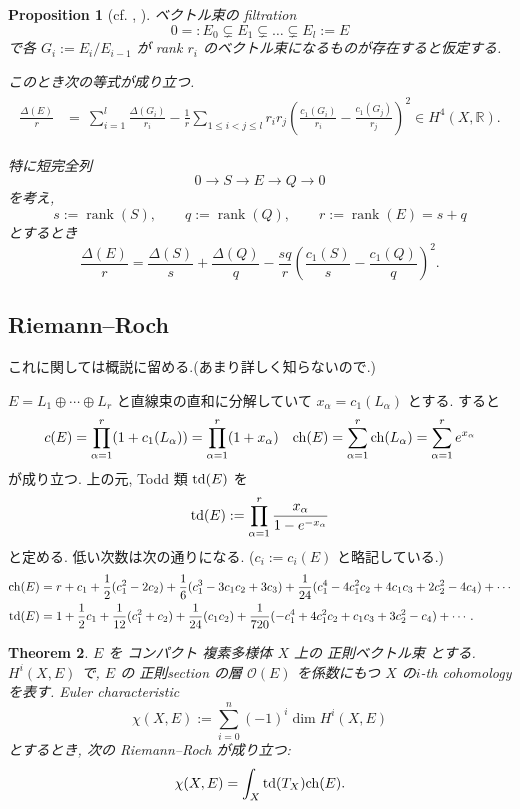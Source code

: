 \documentclass[dvipdfmx,a4paper,11pt]{article} %
\newtheorem{thm}{Theorem}[section]
\newtheorem{prop}[thm]{Proposition}
\theoremstyle{definition}
\theoremstyle{remark}
\numberwithin{equation}{section}
\newcommand{\ch}{{\rm ch}}
\newcommand{\td}{{\rm td}}
\newcommand{\R}{\mathbb{R}}
\begin{document}
\begin{prop}[{cf. \cite{Lan04}, \cite{Nak04}}]
\label{lem-Langer-ineq-chow}
ベクトル束の filtration
\[
0 =: E_0 \subsetneq E_1 \subsetneq \ldots \subsetneq E_l := E
\]
で各 \(G_i := E_i / E_{i-1}\) が rank \(r_i\) のベクトル束になるものが存在すると仮定する.

このとき次の等式が成り立つ.
\begin{align}
\begin{split}
\frac{\Delta(E) }{r} 
 &= \ \sum_{i=1}^{l} \frac{\Delta(G_i)}{r_i} 
 - \frac{1}{r} \sum_{1 \le i < j \le l} r_i r_j \left( \frac{c_1(G_i)}{r_i} - \frac{c_1(G_j)}{r_j} \right)^2 \in  H^4(X, \R).
\end{split}
\end{align}

特に短完全列
\[
0\longrightarrow S\longrightarrow E\longrightarrow Q\longrightarrow 0
\]
を考え,
\[
s:=\operatorname{rank}(S),\qquad q:=\operatorname{rank}(Q),\qquad r:=\operatorname{rank}(E)=s+q
\]
とするとき
\[
\frac{\Delta(E)}{r}
=
\frac{\Delta(S)}{s}
+
\frac{\Delta(Q)}{q}
-
\frac{sq}{r}
\left(
\frac{c_1(S)}{s}
-
\frac{c_1(Q)}{q}
\right)^2.
\]
\end{prop}

\subsection{Riemann--Roch}
これに関しては概説に留める.(あまり詳しく知らないので.)

\(E=L_1\oplus \cdots \oplus L_r\) と直線束の直和に分解していて \(x_\alpha = c_1(L_\alpha)\) とする. すると
\[
c(E)=\prod_{\alpha=1}^{r}(1 + c_1(L_\alpha))=\prod_{\alpha=1}^{r}(1 + x_\alpha )
\quad
\ch(E)=\sum_{\alpha=1}^{r}\ch(L_\alpha)=\sum_{\alpha=1}^{r}e^{x_\alpha}
\]
が成り立つ. 上の元, Todd 類 \(\td(E)\) を
\[
\td(E):=\prod_{\alpha=1}^{r} \frac{x_\alpha}{1-e^{-x_\alpha}}
\]
と定める.
低い次数は次の通りになる. (\(c_i:=c_i(E)\) と略記している.)
\begin{align*}
\ch (E) &= r + c_1 + \frac{1}{2}(c_{1}^{2} - 2 c_2) + \frac{1}{6} (c_{1}^{3} - 3 c_1 c_2 + 3 c_3) + \frac{1}{24}(c_{1}^{4} - 4c_{1}^{2}c_2 + 4c_1c_3 + 2 c_{2}^{2} - 4c_4) + \cdots
\\
\td(E)
&= 1 + \frac{1}{2}c_1 
+ \frac{1}{12}(c_{1}^{2}  +  c_2) 
+ \frac{1}{24} (c_{1}c_2) + \frac{1}{720}( - c_{1}^{4}  + 4c_{1}^{2}c_2 + c_1c_3 + 3 c_{2}^{2} - c_4) + \cdots.
\end{align*}

\begin{thm}
\(E\) を コンパクト 複素多様体 \(X\) 上の 正則ベクトル束 とする. \(H^i(X,E)\) で, \(E\) の 正則section の層 \(\mathcal{O}(E)\) を係数にもつ \(X\) の\(i\)-th cohomology を表す. Euler characteristic
\[
\chi(X,E):=\sum_{i=0}^{n} (-1)^i \dim H^i(X,E)
\]
とするとき, 次の Riemann--Roch が成り立つ:
\[
\chi(X,E)
=
\int_X \td(T_X)\ch(E).
\]
\end{thm}
\end{document}
